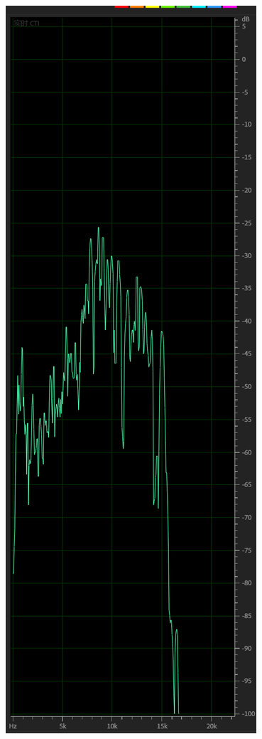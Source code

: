 \documentclass[UTF8,9pt]{report}
\begin{document}
    \begin{center}
        \includegraphics[scale=0.4]{1_20.png}

\end{center}
\end{document}
